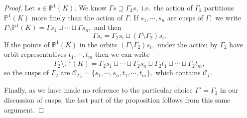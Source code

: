 \documentclass[11pt]{amsart}
\theoremstyle{definition}
\numberwithin{equation}{section}
\newcommand{\cC}{\mathcal{C}}		%
\newcommand{\bbF}{\mathbb{F}}		%
\newcommand{\bbP}{\mathbb{P}}		%
\newcommand{\jesse}[1]{{\color{blue} \sf $\spadesuit\spadesuit\spadesuit$ Jesse: [#1]}} %
\begin{document}
\begin{proof}
			Let $s\in \bbP^1(K).$ We know $\Gamma s\supseteq \Gamma_2 s,$ i.e.\ the action of $\Gamma_2$ partitions $\bbP^1(K)$ more finely than the action of $\Gamma.$ If $s_1,\cdots, s_n$ are cusps of $\Gamma,$ we write $\Gamma\setminus\bbP^1(K)=\Gamma s_1\sqcup \cdots \sqcup\Gamma s_n,$ and then 
			\[\Gamma s_i=\Gamma_2 s_i\sqcup (\Gamma\setminus \Gamma_2)s_i.\]
			If the points of $\bbP^1(K)$ in the orbits $(\Gamma\setminus \Gamma_2)s_i,$ under the action by $\Gamma_2$ have orbit representatives $t_1,\cdots, t_m$ then we can write 
			\[\Gamma_2\setminus\bbP^1(K)=\Gamma_2 s_1\sqcup \cdots \sqcup \Gamma_2 s_n\sqcup \Gamma_2t_1\sqcup\cdots\sqcup\Gamma_2 t_m,\] so the cusps of $\Gamma_2$ are $\cC_{\Gamma_2}=\{s_1,\cdots, s_n,t_1,\cdots, t_m\},$ which contains $\cC_{\Gamma}.$
			
			Finally, as we have made no reference to the particular choice $\Gamma'=\Gamma_2$ in our discussion of cusps, the last part of the proposition follows from this same argument.
			
			

\end{proof}
\end{document}
